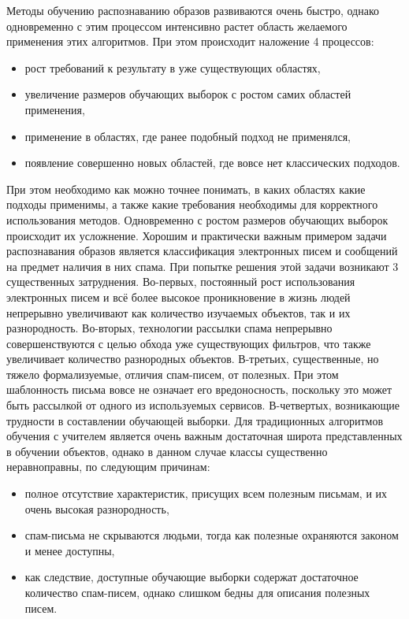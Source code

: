 \documentclass[12pt]{article}
\begin{document}
	Методы обучению распознаванию образов развиваются очень быстро, однако одновременно с этим процессом интенсивно растет область желаемого применения этих алгоритмов. 
	При этом происходит наложение 4 процессов:
	\begin{itemize}
		\item рост требований к результату в уже существующих областях,
		\item увеличение размеров обучающих выборок с ростом самих областей применения,
		\item применение в областях, где ранее подобный подход не применялся,
		\item появление совершенно новых областей, где вовсе нет классических подходов.
	\end{itemize}
	При этом необходимо как можно точнее понимать, в каких областях какие подходы применимы, а также какие требования необходимы для корректного использования методов.
	Одновременно с ростом размеров обучающих выборок происходит их усложнение. 
	Хорошим и практически важным примером задачи распознавания образов является классификация электронных писем и сообщений на предмет наличия в них спама. 
	При попытке решения этой задачи возникают 3 существенных затруднения. 
	Во-первых, постоянный рост использования электронных писем и всё более высокое проникновение в жизнь людей непрерывно увеличивают как количество изучаемых объектов, так и их разнородность.
	Во-вторых, технологии рассылки спама непрерывно совершенствуются с целью обхода уже существующих фильтров, что также увеличивает количество разнородных объектов.
	В-третьих, существенные, но тяжело формализуемые, отличия спам-писем, от полезных. 
	При этом шаблонность письма вовсе не означает его вредоносность, поскольку это может быть рассылкой от одного из используемых сервисов.
	В-четвертых, возникающие трудности в составлении обучающей выборки. Для традиционных алгоритмов обучения с учителем является очень важным достаточная широта представленных в обучении объектов, однако в данном случае классы существенно неравноправны, по следующим причинам:
	\begin{itemize}
	 	\item полное отсутствие характеристик, присущих всем полезным письмам, и их очень высокая разнородность,
	 	\item спам-письма не скрываются людьми, тогда как полезные охраняются законом и менее доступны,
	 	\item как следствие, доступные обучающие выборки содержат достаточное количество спам-писем, однако слишком бедны для описания полезных писем.
	\end{itemize}
\end{document}
